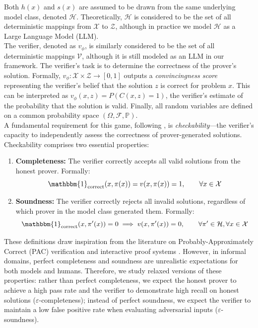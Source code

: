 Both $h(x)$ and $s(x)$ are assumed to be drawn from the same underlying model class, denoted $\mathcal{H}$. Theoretically, $\mathcal{H}$ is considered to be the set of all deterministic mappings from $\mathcal{X}$ to $\mathcal{Z}$, although in practice we model $\mathcal{H}$ as a Large Language Model (LLM).
\\
The verifier, denoted as $v_\phi$, is similarly considered to be the set of all deterministic mappings $\mathcal{V}$, although it is still modeled as an LLM in our framework. The verifier's task is to determine the correctness of the prover's solution. Formally, $v_\phi: \mathcal{X} \times \mathcal{Z} \rightarrow [0,1]$ outputs a \emph{convincingness score} representing the verifier's belief that the solution $z$ is correct for problem $x$. This can be interpreted as $v_\phi(x, z) = P(C(x, z) = 1)$, the verifier's estimate of the probability that the solution is valid. Finally, all random variables are defined on a common probability space $(\Omega, \mathcal{F}, \mathbb{P})$.
\\
A fundamental requirement for this game, following \citet{kirchner2024prover}, is \emph{checkability}—the verifier's capacity to independently assess the correctness of prover-generated solutions. Checkability comprises two essential properties:

\begin{enumerate}
    \item \textbf{Completeness:} The verifier correctly accepts all valid solutions from the honest prover. Formally:
    \[\mathbbm{1}_{\text{correct}}(x, \pi(x)) = v(x, \pi(x)) = 1, \qquad \forall x \in \mathcal{X}\]

    \item \textbf{Soundness:} The verifier correctly rejects all invalid solutions, regardless of which prover in the model class generated them. Formally:
    \[\mathbbm{1}_{\text{correct}}(x, \pi'(x)) = 0 \implies v(x, \pi'(x)) = 0, \qquad \forall \pi' \in \mathcal{H}, \forall x \in \mathcal{X}\]
\end{enumerate}

These definitions draw inspiration from the literature on Probably-Approximately Correct (PAC) verification and interactive proof systems \citep{goldwasser2021interactive, pmlr-v195-mutreja23a}. However, in informal domains, perfect completeness and soundness are unrealistic expectations for both models and humans. Therefore, we study relaxed versions of these properties: rather than perfect completeness, we expect the honest prover to achieve a high pass rate and the verifier to demonstrate high recall on honest solutions ($\varepsilon$-completeness); instead of perfect soundness, we expect the verifier to maintain a low false positive rate when evaluating adversarial inputs ($\varepsilon$-soundness).

